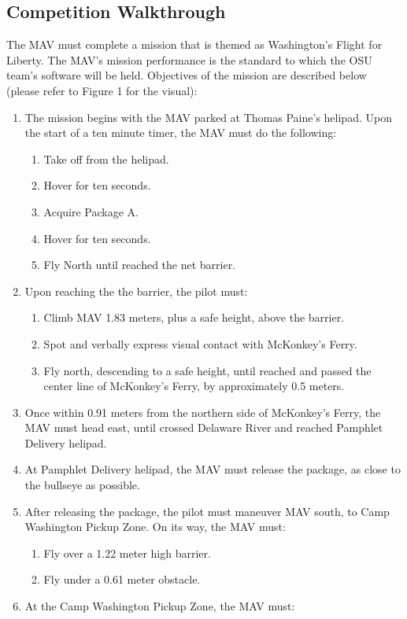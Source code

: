 \documentclass[onecolumn, oneside, letterpaper, draftclsnofoot, 10pt, compsoc]{IEEEtran}
\begin{document}
\subsection{Competition Walkthrough}
The MAV must complete a mission that is themed as Washington’s Flight for Liberty. The MAV's mission performance is the standard to which the OSU team's software will be held. Objectives of the mission are described below (please refer to Figure 1 for the visual):
\begin{enumerate}
\item The mission begins with the MAV parked at Thomas Paine’s helipad. Upon the start of a ten minute timer, the MAV must do the following:
\begin{enumerate}
\item Take off from the helipad.
\item Hover for ten seconds.
\item Acquire Package A.
\item Hover for ten seconds.
\item Fly North until reached the net barrier.
\end{enumerate}
\item Upon reaching the the barrier, the pilot must:
\begin{enumerate}
\item Climb MAV 1.83 meters, plus a safe height, above the barrier.
\item Spot and verbally express visual contact with McKonkey’s Ferry.
\item Fly north, descending to a safe height, until reached and passed the center line of McKonkey’s Ferry, by approximately 0.5 meters.
\end{enumerate}
\item Once within 0.91 meters from the northern side of McKonkey’s Ferry, the MAV must head east, until crossed Delaware River and reached Pamphlet Delivery helipad.
\item At Pamphlet Delivery helipad, the MAV must release the package, as close to the bullseye as possible.
\item After releasing the package, the pilot must maneuver MAV south, to Camp Washington Pickup Zone. On its way, the MAV must:
\begin{enumerate}
\item Fly over a 1.22 meter high barrier.
\item Fly under a 0.61 meter obstacle.
\end{enumerate}
\item At the Camp Washington Pickup Zone, the MAV must:

\end{enumerate}
\end{document}
